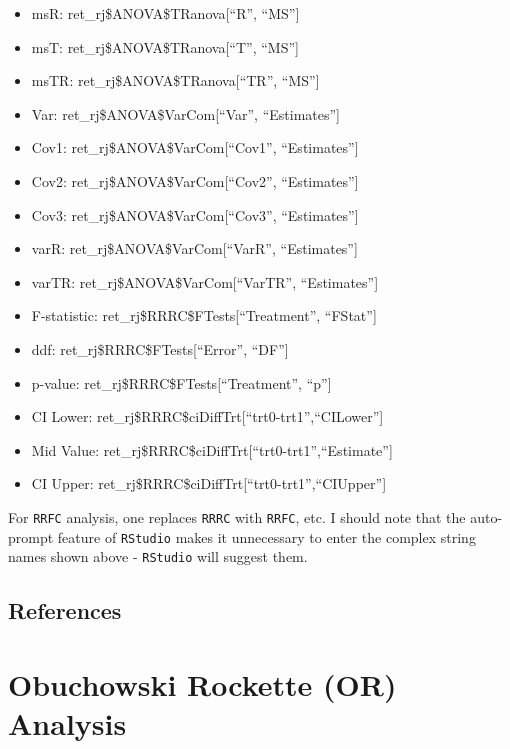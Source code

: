 \documentclass[
]{book}
\providecommand{\tightlist}{%
  \setlength{\itemsep}{0pt}\setlength{\parskip}{0pt}}
\begin{document}
\begin{itemize}
\tightlist
\item
  msR: ret\_rj\$ANOVA\$TRanova{[}``R'', ``MS''{]}
\item
  msT: ret\_rj\$ANOVA\$TRanova{[}``T'', ``MS''{]}
\item
  msTR: ret\_rj\$ANOVA\$TRanova{[}``TR'', ``MS''{]}
\item
  Var: ret\_rj\$ANOVA\$VarCom{[}``Var'', ``Estimates''{]}
\item
  Cov1: ret\_rj\$ANOVA\$VarCom{[}``Cov1'', ``Estimates''{]}
\item
  Cov2: ret\_rj\$ANOVA\$VarCom{[}``Cov2'', ``Estimates''{]}
\item
  Cov3: ret\_rj\$ANOVA\$VarCom{[}``Cov3'', ``Estimates''{]}
\item
  varR: ret\_rj\$ANOVA\$VarCom{[}``VarR'', ``Estimates''{]}
\item
  varTR: ret\_rj\$ANOVA\$VarCom{[}``VarTR'', ``Estimates''{]}
\item
  F-statistic: ret\_rj\$RRRC\$FTests{[}``Treatment'', ``FStat''{]}
\item
  ddf: ret\_rj\$RRRC\$FTests{[}``Error'', ``DF''{]}
\item
  p-value: ret\_rj\$RRRC\$FTests{[}``Treatment'', ``p''{]}
\item
  CI Lower: ret\_rj\$RRRC\$ciDiffTrt{[}``trt0-trt1'',``CILower''{]}
\item
  Mid Value: ret\_rj\$RRRC\$ciDiffTrt{[}``trt0-trt1'',``Estimate''{]}
\item
  CI Upper: ret\_rj\$RRRC\$ciDiffTrt{[}``trt0-trt1'',``CIUpper''{]}
\end{itemize}

For \texttt{RRFC} analysis, one replaces \texttt{RRRC} with \texttt{RRFC}, etc. I should note that the auto-prompt feature of \texttt{RStudio} makes it unnecessary to enter the complex string names shown above - \texttt{RStudio} will suggest them.

\hypertarget{or-method-intro-references}{%
\section{References}\label{or-method-intro-references}}

\hypertarget{or-analysis-st}{%
\chapter{Obuchowski Rockette (OR) Analysis}\label{or-analysis-st}}
\end{document}
